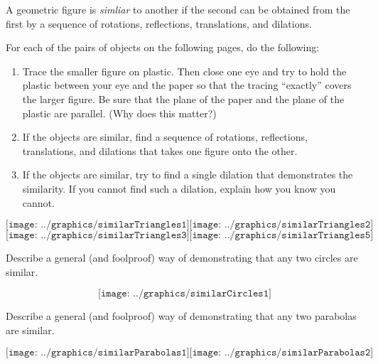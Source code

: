 \begin{definition}
A geometric figure is \emph{simliar} to another if the second can be obtained from the first by a sequence of rotations, reflections, translations, and dilations.  
\end{definition}

\begin{prob}
For each of the pairs of objects on the following pages, do the following:  
\begin{enumerate}
\item Trace the smaller figure on plastic.  Then close one eye and try to hold the plastic between your eye and the paper so that the tracing ``exactly'' covers the larger figure.   Be sure that the plane of the paper and the plane of the plastic are parallel.  (Why does this matter?) 
\item If the objects are similar, find a sequence of rotations, reflections, translations, and dilations that takes one figure onto the other.  
\item If the objects are similar, try to find a single dilation that demonstrates the similarity.   If you cannot find such a dilation, explain how you know you cannot.  
\end{enumerate}
\end{prob}
\vfill
\[
\texttt{[image: ../graphics/similarTriangles1]}
\texttt{[image: ../graphics/similarTriangles2]}
\]
\vfill
\newpage
\vfill
\[
\texttt{[image: ../graphics/similarTriangles3]}
\texttt{[image: ../graphics/similarTriangles5]}
\]
\vfill
\newpage
\begin{prob}
Describe a general (and foolproof) way of demonstrating that any two circles are similar. 
\end{prob}
\vfill
$$\texttt{[image: ../graphics/similarCircles1]}$$
\vfill
\newpage

\begin{prob}
Describe a general (and foolproof) way of demonstrating that any two parabolas are similar. 
\end{prob}
\vfill
\[
\texttt{[image: ../graphics/similarParabolas1]}
\texttt{[image: ../graphics/similarParabolas2]}
\]

\vfill



